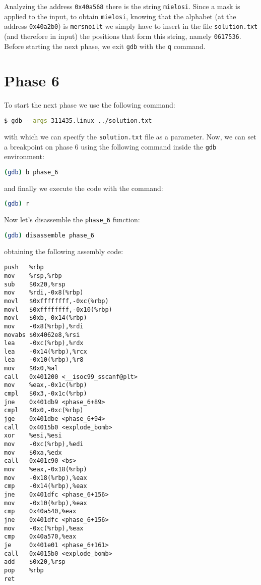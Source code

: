 \documentclass[a4paper,12pt]{report}  %
\newcommand{\lstinlinebg}[1]{\colorbox{backcolour}{\lstinline|#1|}}
\begin{document}
Analyzing the address \lstinlinebg{0x40a568} there is the string \lstinlinebg{mielosi}.
Since a mask is applied to the input, to obtain \lstinlinebg{mielosi}, knowing that the alphabet (at the address \lstinlinebg{0x40a2b0}) is \lstinlinebg{mersnoilt} we simply have to insert in the file \lstinlinebg{solution.txt} (and therefore in input) the positions that form this string, namely \lstinlinebg{0617536}.
Before starting the next phase, we exit \lstinlinebg{gdb} with the \lstinlinebg{q} command.

\section{Phase 6}
To start the next phase we use the following command:
\begin{lstlisting}[language=bash,numbers=none]
$ gdb --args 311435.linux ../solution.txt
\end{lstlisting}
with which we can specify the \lstinlinebg{solution.txt} file as a parameter.
Now, we can set a breakpoint on phase 6 using the following command inside the \lstinlinebg{gdb} environment:
\begin{lstlisting}[language=bash, numbers=none]
(gdb) b phase_6
\end{lstlisting}
and finally we execute the code with the command:
\begin{lstlisting}[language=bash, numbers=none]
(gdb) r
\end{lstlisting}
Now let's disassemble the \lstinlinebg{phase_6} function:
\begin{lstlisting}[language=bash, numbers=none]
(gdb) disassemble phase_6
\end{lstlisting}
obtaining the following assembly code:
\begin{lstlisting}[language=x86_64]
push   %rbp
mov    %rsp,%rbp
sub    $0x20,%rsp
mov    %rdi,-0x8(%rbp)
movl   $0xffffffff,-0xc(%rbp)
movl   $0xffffffff,-0x10(%rbp)
movl   $0xb,-0x14(%rbp)
mov    -0x8(%rbp),%rdi
movabs $0x4062e8,%rsi
lea    -0xc(%rbp),%rdx
lea    -0x14(%rbp),%rcx
lea    -0x10(%rbp),%r8
mov    $0x0,%al
call   0x401200 <__isoc99_sscanf@plt>
mov    %eax,-0x1c(%rbp)
cmpl   $0x3,-0x1c(%rbp)
jne    0x401db9 <phase_6+89>
cmpl   $0x0,-0xc(%rbp)
jge    0x401dbe <phase_6+94>
call   0x4015b0 <explode_bomb>
xor    %esi,%esi
mov    -0xc(%rbp),%edi
mov    $0xa,%edx
call   0x401c90 <bs>
mov    %eax,-0x18(%rbp)
mov    -0x18(%rbp),%eax
cmp    -0x14(%rbp),%eax
jne    0x401dfc <phase_6+156>
mov    -0x10(%rbp),%eax
cmp    0x40a540,%eax
jne    0x401dfc <phase_6+156>
mov    -0xc(%rbp),%eax
cmp    0x40a570,%eax
je     0x401e01 <phase_6+161>
call   0x4015b0 <explode_bomb>
add    $0x20,%rsp
pop    %rbp
ret
\end{lstlisting}
\end{document}
